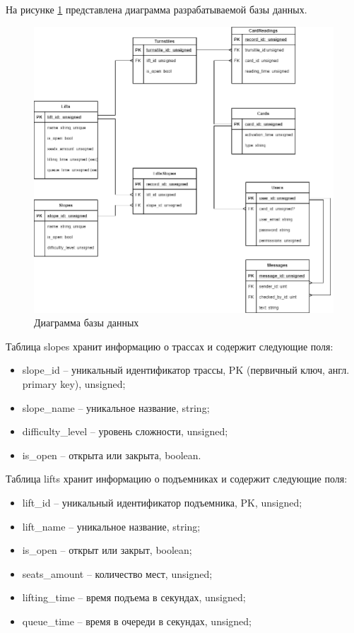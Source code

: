 На рисунке \ref{img:db} представлена диаграмма разрабатываемой базы данных.

\begin{figure}[h!]
	\begin{center}
		\includegraphics[scale=0.4]{../imgs/db/db.png}
	\end{center}
	\captionsetup{justification=centering}
	\caption{Диаграмма базы данных}
	\label{img:db}
\end{figure}

Таблица slopes хранит информацию о трассах и содержит следующие поля:
\begin{itemize}
	\item slope\_id -- уникальный идентификатор трассы, PK (первичный ключ, англ. primary key), unsigned;
	\item slope\_name -- уникальное название, string;
	\item difficulty\_level -- уровень сложности, unsigned;
	\item is\_open -- открыта или закрыта, boolean.
\end{itemize}


Таблица lifts хранит информацию о подъемниках и содержит следующие поля:
\begin{itemize}
	\item lift\_id -- уникальный идентификатор подъемника, PK, unsigned;
	\item lift\_name -- уникальное название, string;
	\item is\_open -- открыт или закрыт, boolean;
	\item seats\_amount -- количество мест, unsigned;
	\item lifting\_time -- время подъема в секундах, unsigned;
	\item queue\_time -- время в очереди в секундах, unsigned;
\end{itemize}


